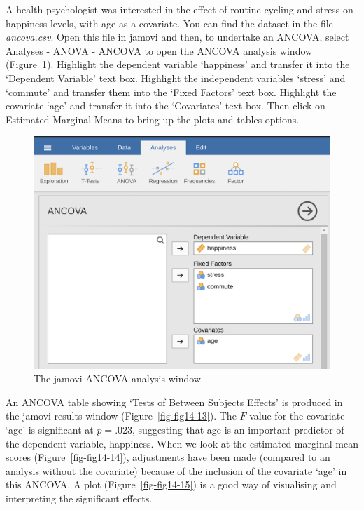 \documentclass[
  a4paper,
]{book}
\begin{document}
A health psychologist was interested in the effect of routine cycling
and stress on happiness levels, with age as a covariate. You can find
the dataset in the file \emph{ancova.csv}. Open this file in jamovi and
then, to undertake an ANCOVA, select Analyses - ANOVA - ANCOVA to open
the ANCOVA analysis window (Figure~\ref{fig-fig14-12}). Highlight the
dependent variable `happiness' and transfer it into the `Dependent
Variable' text box. Highlight the independent variables `stress' and
`commute' and transfer them into the `Fixed Factors' text box. Highlight
the covariate `age' and transfer it into the `Covariates' text box. Then
click on Estimated Marginal Means to bring up the plots and tables
options.

\begin{figure}

\includegraphics[width=1\textwidth,height=\textheight]{images/fig14-12.png} \hfill{}

\caption{\label{fig-fig14-12}The jamovi ANCOVA analysis window}

\end{figure}

An ANCOVA table showing `Tests of Between Subjects Effects' is produced
in the jamovi results window (Figure~\ref{fig-fig14-13}). The
\(F\)-value for the covariate `age' is significant at \(p = .023\),
suggesting that age is an important predictor of the dependent variable,
happiness. When we look at the estimated marginal mean scores
(Figure~\ref{fig-fig14-14}), adjustments have been made (compared to an
analysis without the covariate) because of the inclusion of the
covariate `age' in this ANCOVA. A plot (Figure~\ref{fig-fig14-15}) is a
good way of visualising and interpreting the significant effects.
\end{document}
